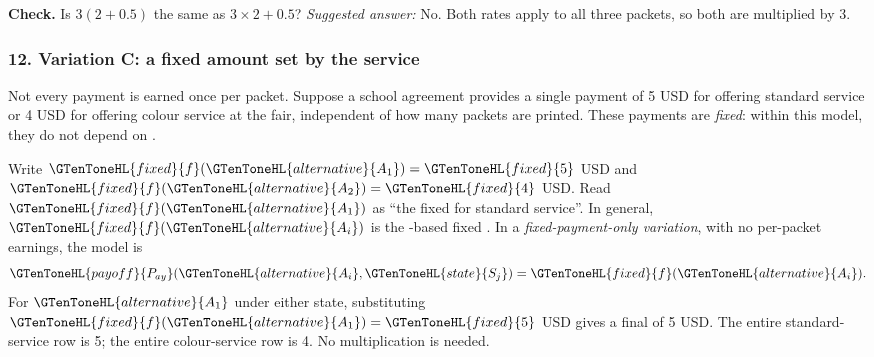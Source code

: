 \textbf{Check.} Is $3(2+0.5)$ the same as $3\times2+0.5$? \emph{Suggested answer:} No. Both rates apply to all three packets, so both are multiplied by 3.

\subsubsection*{12. Variation C: a fixed amount set by the service}
Not every payment is earned once per packet. Suppose a school agreement provides a single payment of 5 USD for offering standard service or 4 USD for offering colour service at the fair, independent of how many packets are printed. These payments are \emph{fixed}: within this model, they do not depend on .

Write $\GTenToneHL{fixed}{f}(\GTenToneHL{alternative}{A_1})=\GTenToneHL{fixed}{5}$ USD and $\GTenToneHL{fixed}{f}(\GTenToneHL{alternative}{A_2})=\GTenToneHL{fixed}{4}$ USD. Read $\GTenToneHL{fixed}{f}(\GTenToneHL{alternative}{A_1})$ as ``the fixed  for standard service''. In general, $\GTenToneHL{fixed}{f}(\GTenToneHL{alternative}{A_i})$ is the -based fixed . In a \emph{fixed-payment-only variation}, with no per-packet earnings, the model is
\[\GTenToneHL{payoff}{P_{ay}}(\GTenToneHL{alternative}{A_i},\GTenToneHL{state}{S_j})=\GTenToneHL{fixed}{f}(\GTenToneHL{alternative}{A_i}).\]
For $\GTenToneHL{alternative}{A_1}$ under either state, substituting $\GTenToneHL{fixed}{f}(\GTenToneHL{alternative}{A_1})=\GTenToneHL{fixed}{5}$ USD gives a final  of 5 USD. The entire standard-service row is 5; the entire colour-service row is 4. No  multiplication is needed.

